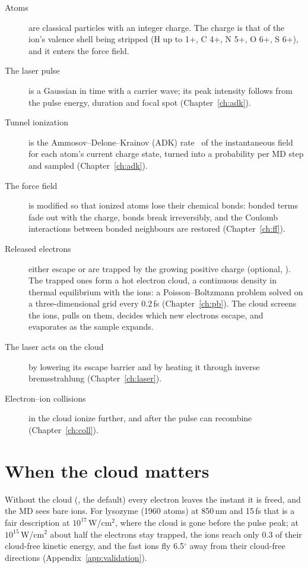 \begin{description}
  \item[Atoms] are classical particles with an integer charge.
    The charge is that of the ion's valence shell being stripped (H up to 1+, C 4+, N 5+, O 6+, S 6+), and it enters
    the force field.
  \item[The laser pulse] is a Gaussian in time with a carrier wave; its peak intensity follows from the pulse energy,
    duration and focal spot (Chapter~\ref{ch:adk}).
  \item[Tunnel ionization] is the Ammosov--Delone--Krainov (ADK) rate~\cite{adk1986,tong2002} of the instantaneous
    field for each atom's current charge state, turned into a probability per MD step and sampled (Chapter~\ref{ch:adk}).
  \item[The force field] is modified so that ionized atoms lose their chemical bonds: bonded terms fade out with the
    charge, bonds break irreversibly, and the Coulomb interactions between bonded neighbours are restored
    (Chapter~\ref{ch:ff}).
  \item[Released electrons] either escape or are trapped by the growing positive charge (optional,
    ).
    The trapped ones form a hot electron cloud, a continuous density in thermal equilibrium with the ions: a
    Poisson--Boltzmann problem solved on a three-dimensional grid every 0.2\,fs (Chapter~\ref{ch:pb}).
    The cloud screens the ions, pulls on them, decides which new electrons escape, and evaporates as the sample expands.
  \item[The laser acts on the cloud] by lowering its escape barrier and by heating it through inverse bremsstrahlung
    (Chapter~\ref{ch:laser}).
  \item[Electron--ion collisions] in the cloud ionize further, and after the pulse can recombine
    (Chapter~\ref{ch:coll}).
\end{description}

\section{When the cloud matters}

Without the cloud (, the default) every electron leaves the instant it is freed, and the MD
sees bare ions.
For lysozyme (1960 atoms) at 850\,nm and 15\,fs that is a fair description at $10^{17}$\,W/cm$^2$, where the cloud is
gone before the pulse peak; at $10^{15}$\,W/cm$^2$ about half the electrons stay trapped, the ions reach only 0.3 of
their cloud-free kinetic energy, and the fast ions fly 6.5$^\circ$ away from their cloud-free directions
(Appendix~\ref{app:validation}).

